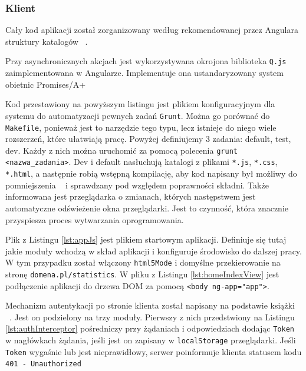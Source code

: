 \documentclass[10pt,titlepage]{article}
\begin{document}
\subsubsection{Klient}
\lstset{language=JavaScript}
\par Cały kod aplikacji został zorganizowany według rekomendowanej przez Angulara struktury katalogów ~\cite{angular:structure}.
\par Przy asynchronicznych akcjach jest wykorzystywana okrojona biblioteka \verb|Q.js| ~\cite{lib:q} zaimplementowana w Angularze. Implementuje ona ustandaryzowany system obietnic Promises/A+ ~\cite{doc:promises}

\par Kod przestawiony na powyższym listingu jest plikiem konfiguracyjnym dla systemu do automatyzacji pewnych zadań \verb|Grunt|. Można go porównać do \verb|Makefile|, ponieważ jest to narzędzie tego typu, lecz istnieje do niego wiele rozszerzeń, które ułatwiają pracę. Powyżej definiujemy 3 zadania: default, test, dev. Każdy z nich można uruchomić za pomocą polecenia \verb|grunt <nazwa_zadania>|. Dev i default nasłuchują katalogi z plikami \verb|*.js|, \verb|*.css|, \verb|*.html|, a następnie robią wstępną kompilację, aby kod napisany był możliwy do pomniejszenia ~\cite{angular:minSafe} i sprawdzany pod względem poprawności składni. Także informowana jest przeglądarka o zmianach, których następstwem jest automatyczne odświeżenie okna przeglądarki. Jest to czynność, która znacznie przyspiesza proces wytwarzania oprogramowania.
\par Plik z Listingu \ref{lst:appJs} jest plikiem startowym aplikacji. Definiuje się tutaj jakie moduły wchodzą w skład aplikacji i konfiguruje środowisko do dalszej pracy. W tym przypadku został włączony \verb|html5Mode| i domyślne przekierowanie na stronę \verb|domena.pl/statistics|. W pliku z Listingu \ref{lst:homeIndexView} jest podłączenie aplikacji do drzewa DOM za pomocą \verb|<body ng-app="app">|.

Mechanizm autentykacji po stronie klienta został napisany na podstawie książki ~\cite{angular:bookMastering}. Jest on podzielony na trzy moduły. Pierwszy z nich przedstwiony na Listingu \ref{lst:authInterceptor} pośredniczy przy żądaniach \linebreak i odpowiedziach dodając \verb|Token| w nagłówkach żądania, jeśli jest on zapisany w \verb|localStorage| przeglądarki. Jeśli \verb|Token| wygaśnie lub jest nieprawidłowy, serwer poinformuje klienta statusem kodu \verb|401 - Unauthorized| ~\cite{http:statuscodes}
\end{document}
